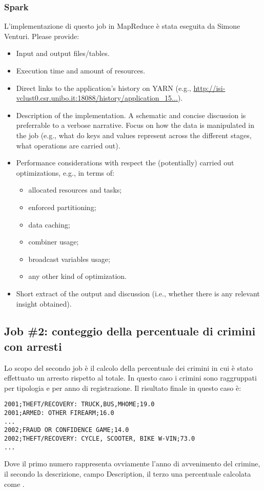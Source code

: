 \documentclass[10pt]{article}
\begin{document}
\subsubsection{Spark}
L'implementazione di questo job in MapReduce è stata eseguita da Simone Venturi.
Please provide:
\begin{itemize}
\item Input and output files/tables.
\item Execution time and amount of resources.
\item Direct links to the application's history on YARN (e.g., \url{http://isi-vclust0.csr.unibo.it:18088/history/application_15...}).
\item Description of the implementation. A schematic and concise discussion is preferrable to a verbose narrative. Focus on how the data is manipulated in the job (e.g., what do keys and values represent across the different stages, what operations are carried out). 
\item Performance considerations with respect the (potentially) carried out optimizations, e.g., in terms of:
\begin{itemize}
\item allocated resources and tasks;
\item enforced partitioning;
\item data caching;
\item combiner usage;
\item broadcast variables usage;
\item any other kind of optimization.
\end{itemize}
\item Short extract of the output and discussion (i.e., whether there is any relevant insight obtained).
\end{itemize}

\subsection{Job \#2: conteggio della percentuale di crimini con arresti}
Lo scopo del secondo job è il calcolo della percentuale dei crimini in cui è stato effettuato un arresto rispetto al totale. In questo caso i crimini sono raggruppati per tipologia e per anno di registrazione.
Il risultato finale in questo caso è:
\begin{lstlisting}
2001;THEFT/RECOVERY: TRUCK,BUS,MHOME;19.0
2001;ARMED: OTHER FIREARM;16.0
...
2002;FRAUD OR CONFIDENCE GAME;14.0
2002;THEFT/RECOVERY: CYCLE, SCOOTER, BIKE W-VIN;73.0
...
\end{lstlisting}
Dove il primo numero rappresenta ovviamente l'anno di avvenimento del crimine, il secondo la descrizione, campo Description, il terzo una percentuale calcolata come
 .
\end{document}
